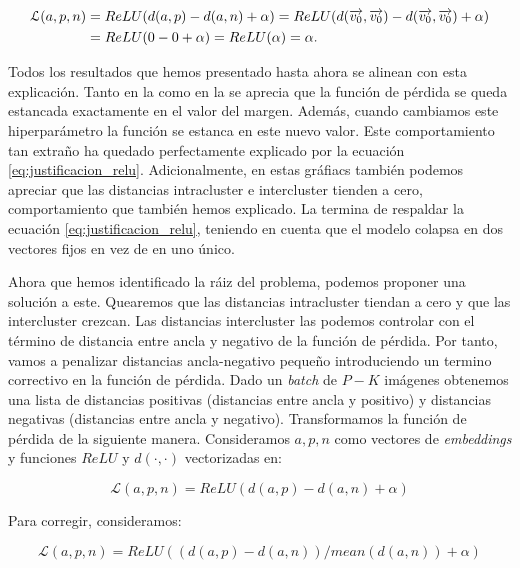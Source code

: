 \begin{equation} \label{eq:justificacion_relu}
\begin{split}
    \mathcal{L}(a, p, n) &= ReLU(d(a, p) - d(a, n) + \alpha) = ReLU(d(\overrightarrow{v_0}, \overrightarrow{v_0}) - d(\overrightarrow{v_0}, \overrightarrow{v_0}) + \alpha) \\
    &= ReLU(0 - 0 + \alpha) = ReLU(\alpha) = \alpha.
\end{split}
\end{equation}

Todos los resultados que hemos presentado hasta ahora se alinean con esta explicación. Tanto en la  como en la  se aprecia que la función de pérdida se queda estancada exactamente en el valor del margen. Además, cuando cambiamos este hiperparámetro la función se estanca en este nuevo valor. Este comportamiento tan extraño ha quedado perfectamente explicado por la ecuación \eqref{eq:justificacion_relu}. Adicionalmente, en estas gráfiacs también podemos apreciar que las distancias intracluster e intercluster tienden a cero, comportamiento que también hemos explicado. La  termina de respaldar la ecuación \eqref{eq:justificacion_relu}, teniendo en cuenta que el modelo colapsa en dos vectores fijos en vez de en uno único.

Ahora que hemos identificado la ráiz del problema, podemos proponer una solución a este. Quearemos que las distancias intracluster tiendan a cero y que las intercluster crezcan. Las distancias intercluster las podemos controlar con el término de distancia entre ancla y negativo de la función de pérdida. Por tanto, vamos a penalizar distancias ancla-negativo pequeño introduciendo un termino correctivo en la función de pérdida. Dado un \textit{batch} de $P-K$ imágenes obtenemos una lista de distancias positivas (distancias entre ancla y positivo) y distancias negativas (distancias entre ancla y negativo). Transformamos la función de pérdida de la siguiente manera. Consideramos $a, p, n$ como vectores de \textit{embeddings} y funciones $ReLU$ y $d(\cdot, \cdot)$ vectorizadas en:

\begin{equation}
    \mathcal{L}(a, p, n) = ReLU(d(a, p) - d(a, n) + \alpha)
\end{equation}

Para corregir, consideramos:

\begin{equation}
    \mathcal{L}(a, p, n) = ReLU((d(a, p) - d(a, n)) / mean(d(a, n)) + \alpha)
\end{equation}

